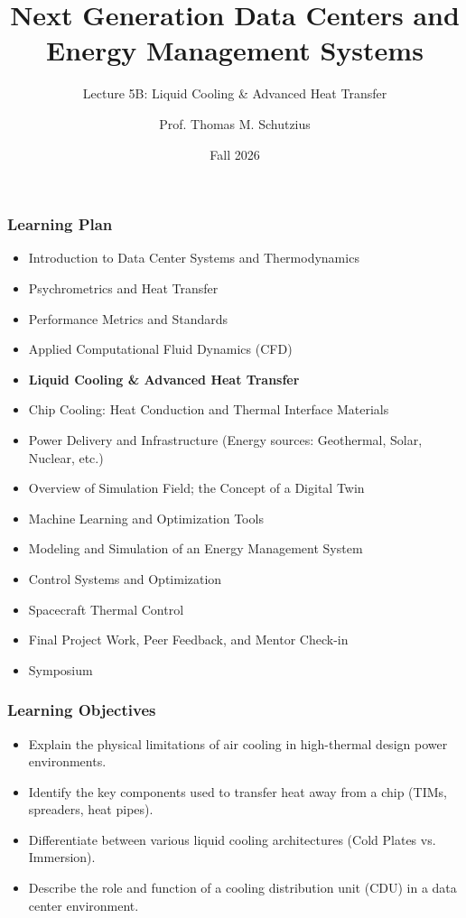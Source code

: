 \documentclass[aspectratio=169,10pt,xcolor={table,dvipsnames},t]{beamer}
\title[lecture 05]{Next Generation Data Centers and Energy Management Systems}
\subtitle{Lecture 5B: Liquid Cooling \& Advanced Heat Transfer}
\author{Prof. Thomas M. Schutzius}
\institute{Department of Mechanical Engineering}
\date{Fall 2026}
\begin{document}
\begin{frame}
  \titlepage
\end{frame}


\smallframetitle

{
	\begin{frame}
		\frametitle{Learning Plan}
		\begin{itemize}
			\item Introduction to Data Center Systems and Thermodynamics 
			\item Psychrometrics and Heat Transfer
			\item Performance Metrics and Standards
			\item Applied Computational Fluid Dynamics (CFD)
			\item \textbf{Liquid Cooling \& Advanced Heat Transfer}
			\item Chip Cooling: Heat Conduction and Thermal Interface Materials 
			\item Power Delivery and Infrastructure (Energy sources: Geothermal, Solar, Nuclear, etc.)
			\item Overview of Simulation Field; the Concept of a Digital Twin 
			\item Machine Learning and Optimization Tools 
			\item Modeling and Simulation of an Energy Management System 
			\item Control Systems and Optimization 
			\item Spacecraft Thermal Control
			\item Final Project Work, Peer Feedback, and Mentor Check-in 
			\item Symposium 
		\end{itemize}		
	\end{frame}
}




	\begin{frame}
		\frametitle{Learning Objectives}
		\begin{itemize}
			\item Explain the physical limitations of air cooling in high-thermal design power environments.
			\item Identify the key components used to transfer heat away from a chip (TIMs, spreaders, heat pipes).
			\item Differentiate between various liquid cooling architectures (Cold Plates vs. Immersion).
			\item Describe the role and function of a cooling distribution unit (CDU) in a data center environment.
		\end{itemize}		
	\end{frame}
\end{document}
